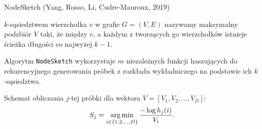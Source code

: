 \begin{frame}[squeeze]{NodeSketch (Yang, Rosso, Li, Cudre-Mauroux, 2019)}
    \begin{definicja}[$k$-sąsiedztwo]
        $k$-sąsiedztwem wierzchołka $v$ w grafie $G = (V,E)$ nazywamy maksymalny podzbiór $V$ taki, że między $v$, a każdym z tworzących go wierzchołków istnieje ścieżka długości co najwyżej $k - 1$. 
    \end{definicja}

    Algorytm \texttt{NodeSketch} wykorzystuje $m$ niezależnych funkcji haszujących do rekurencyjnego generowania próbek z rozkładu wykładniczego na podstawie ich $k$-sąsiedztwa.


    Schemat obliczania $j$-tej próbki dla wektora $V = [V_1, V_2, \dots, V_D]$:
    \[
        S_j = \operatorname*{arg\,min}_{i \in \{1,2,\dots, D\}} \frac{-\log h_{j}(i)}{V_i}.
    \]

\end{frame}